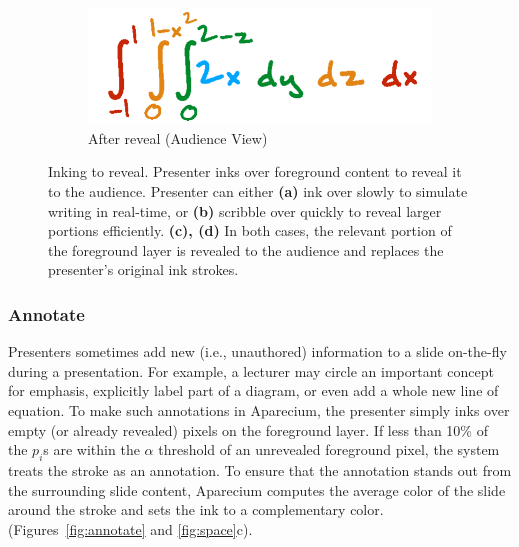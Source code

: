 \begin{figure}[h!]
\begin{subfigure}[t]{0.4\columnwidth}
        \centering
        \includegraphics[width=1\columnwidth]{figures/fastink_audience}
                \captionsetup{font=footnotesize}
\caption{After reveal (Audience View)}
    \end{subfigure}
    \caption{Inking to reveal. Presenter inks over foreground content to reveal it to the audience. Presenter can either \textbf{(a)} ink over slowly to simulate writing in real-time, or \textbf{(b)} scribble over quickly to reveal larger portions efficiently. \textbf{(c), (d)} In both cases, the relevant portion of the foreground layer is revealed to the audience and replaces the presenter's original ink strokes.}
    \label{fig:inkreveal}
\end{figure}

\subsubsection{Annotate}
Presenters sometimes add new (i.e., unauthored) information to a slide on-the-fly during a presentation.
%
For example, a lecturer may circle an important concept for emphasis, explicitly label part of a diagram, or even add a whole new line of equation. 
%
To make such annotations in Aparecium, the presenter simply inks over empty (or already revealed) pixels on the foreground layer. If less than 10\% of the $p_i$s are within the $\alpha$ threshold of an unrevealed foreground pixel, the system treats the stroke as an annotation. To ensure that the annotation stands out from the surrounding slide content, Aparecium computes the average color of the slide around the stroke and sets the ink to a complementary color. (Figures~\ref{fig:annotate} and \ref{fig:space}c). 

